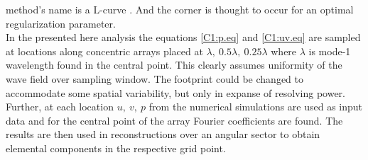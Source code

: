 \documentclass[12pt]{article}
\begin{document}
method's name is a L-curve \citep{hansen1999curve}. And the corner is thought to occur for an 
optimal regularization parameter.\\
In the presented here analysis the equations \eqref{C1:p.eq} and \eqref{C1:uv.eq} are sampled at locations along concentric 
arrays placed at $\lambda,~0.5\lambda,~0.25\lambda$ where $\lambda$ is mode-1 wavelength found in the central point. This clearly assumes uniformity of the wave field over sampling window. The footprint could be changed to accommodate some spatial variability, but only in expanse of resolving power. Further, at each location $u,~v,~p$ from the numerical simulations are used as input data and for the central point of the array Fourier coefficients are found. The results are then used in reconstructions over an angular sector to obtain elemental components in the respective grid point.
\end{document}
